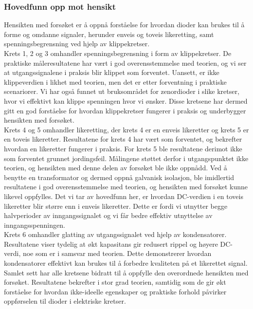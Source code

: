 \subsubsection{Hovedfunn opp mot hensikt}
Hensikten med forsøket er å oppnå forståelse for hvordan dioder kan brukes til å forme og omdanne signaler, herunder enveis og toveis likeretting, samt spenningsbegrensning ved hjelp av klippekretser. 
\\[1em]
Krets 1, 2 og 3 omhandler spenningsbegrensning i form av klippekretser. De praktiske måleresultatene har vært i god overensstemmelse med teorien, og vi ser at utgangssignalene i praksis blir klippet som forventet. Uansett, er ikke klippeverdien i likhet med teorien, men det er etter forventning i praktiske scenariorer. Vi har også funnet ut bruksområdet for zenordioder i slike kretser, hvor vi effektivt kan klippe spenningen hvor vi ønsker. Disse kretsene har dermed gitt en god forståelse for hvordan klippekretser fungerer i praksis og underbygger hensikten med forsøket.
\\[1em]
Krets 4 og 5 omhandler likeretting, der krets 4 er en enveis likeretter og krets 5 er en toveis likeretter. Resultatene for krets 4 har vært som forventet, og bekrefter hvordan en likeretter fungerer i praksis. For krets 5 ble resultatene derimot ikke som forventet grunnet jordingsfeil. Målingene støttet derfor i utgangspunktet ikke teorien, og hensikten med denne delen av forsøket ble ikke oppnådd. Ved å benytte en transformator og dermed oppnå galvanisk isolasjon, ble imidlertid resultatene i god overensstemmelse med teorien, og hensikten med forsøket kunne likevel oppfylles. Det vi tar av hovedfunn her, er hvordan DC-verdien i en toveis likeretter blir større enn i enveis likeretter. Dette er fordi vi utnytter begge halvperioder av inngangssignalet og vi får bedre effektiv utnyttelse av inngangsspenningen.
\\[1em]
Krets 6 omhandler glatting av utgangssignalet ved hjelp av kondensatorer. Resultatene viser tydelig at økt kapasitans gir redusert rippel og høyere DC-verdi, noe som er i samsvar med teorien. Dette demonstrerer hvordan kondensatorer effektivt kan brukes til å forbedre kvaliteten på et likerettet signal.
\\[1em]
Samlet sett har alle kretsene bidratt til å oppfylle den overordnede hensikten med forsøket. Resultatene bekrefter i stor grad teorien, samtidig som de gir økt forståelse for hvordan ikke-ideelle egenskaper og praktiske forhold påvirker oppførselen til dioder i elektriske kretser.


